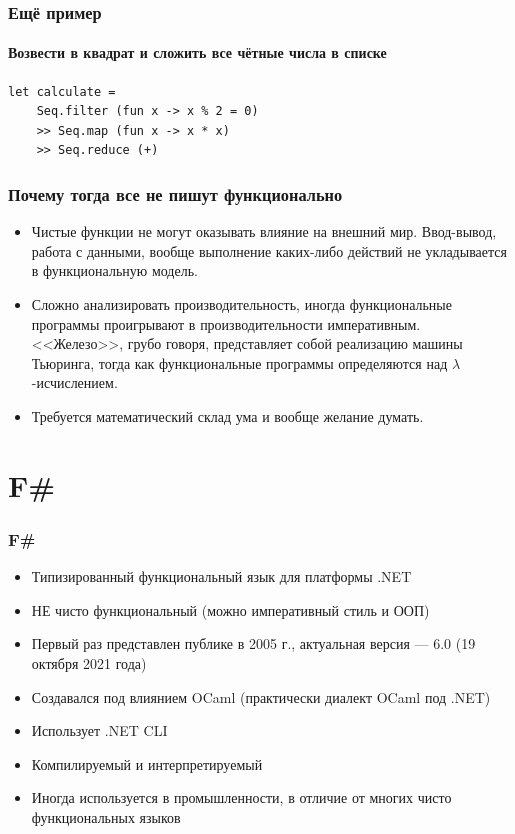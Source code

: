 \documentclass[xetex,mathserif,serif]{beamer}
\begin{document}
    \begin{frame}[fragile]
        \frametitle{Ещё пример}
        \framesubtitle{Возвести в квадрат и сложить все чётные числа в списке}
        \begin{verbatim}
let calculate = 
    Seq.filter (fun x -> x % 2 = 0) 
    >> Seq.map (fun x -> x * x) 
    >> Seq.reduce (+)
        \end{verbatim}
    \end{frame}

    \begin{frame}
        \frametitle{Почему тогда все не пишут функционально}
        \begin{itemize}
            \item Чистые функции не могут оказывать влияние на внешний мир. Ввод-вывод, работа с данными,
                    вообще выполнение каких-либо действий не укладывается в функциональную модель.
            \item Сложно анализировать производительность, иногда функциональные программы проигрывают
                    в производительности императивным. <<Железо>>, грубо говоря, представляет собой 
                    реализацию машины Тьюринга, тогда как функциональные программы определяются над
                    $\lambda$-исчислением.
            \item Требуется математический склад ума и вообще желание думать.
        \end{itemize}
    \end{frame}

    \section{F\#}

    \begin{frame}
        \frametitle{F\#}
        \begin{itemize}
            \item Типизированный функциональный язык для платформы .NET
            \item НЕ чисто функциональный (можно императивный стиль и ООП)
            \item Первый раз представлен публике в 2005 г., актуальная версия --- 6.0 (19 октября 2021 года)
            \item Создавался под влиянием OCaml (практически диалект OCaml под .NET)
            \item Использует .NET CLI
            \item Компилируемый и интерпретируемый
            \item Иногда используется в промышленности, в отличие от многих чисто функциональных языков
        \end{itemize}
    \end{frame}
\end{document}
